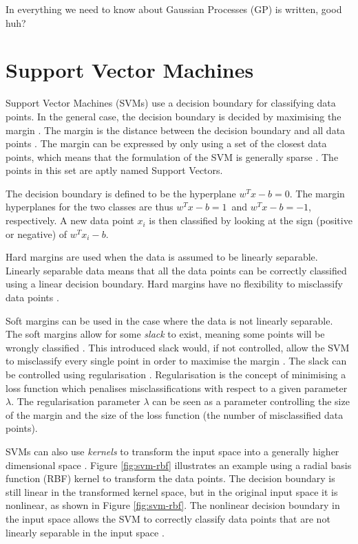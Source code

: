 In \cite{Rasmussen2004} everything we need to know about Gaussian Processes (GP) is written, good huh? 

\section{Support Vector Machines}

Support Vector Machines (SVMs) use a decision boundary for classifying data points.
In the general case, the decision boundary is decided by maximising the margin \cite{Bishop2006}. 
The margin is the distance between the decision boundary and all data points \cite{Cortes1995}.
The margin can be expressed by only using a set of the closest data points, which means that the formulation of the SVM is generally sparse \cite{Bishop2006}.
The points in this set are aptly named Support Vectors.

The decision boundary is defined to be the hyperplane $w^Tx - b = 0$.
The margin hyperplanes for the two classes are thus $w^Tx - b = 1$ and $w^Tx -b = -1$, respectively.
A new data point $x_i$ is then classified by looking at the sign (positive or negative) of $w^T x_i - b$. 

Hard margins are used when the data is assumed to be linearly separable.
Linearly separable data means that all the data points can be correctly classified using a linear decision boundary.
Hard margins have no flexibility to misclassify data points \cite{Bishop2006}.

Soft margins can be used in the case where the data is not linearly separable.
The soft margins allow for some \emph{slack} to exist, meaning some points will be wrongly classified \cite{Cortes1995}.
This introduced slack would, if not controlled, allow the SVM to misclassify every single point in order to maximise the margin \cite{Bishop2006}. 
The slack can be controlled using regularisation \cite{Bishop2006}.
Regularisation is the concept of minimising a loss function which penalises misclassifications with respect to a given parameter $\lambda$.
The regularisation parameter $\lambda$ can be seen as a parameter controlling the size of the margin and the size of the loss function (the number of misclassified data points).

SVMs can also use \emph{kernels} to transform the input space into a generally higher dimensional space \cite{Bishop2006}.
Figure \ref{fig:svm-rbf} illustrates an example using a radial basis function (RBF) kernel to transform the data points.
The decision boundary is still linear in the transformed kernel space, but in the original input space it is nonlinear, as shown in Figure \ref{fig:svm-rbf}.
The nonlinear decision boundary in the input space allows the SVM to correctly classify data points that are not linearly separable in the input space \cite{Bishop2006}.

